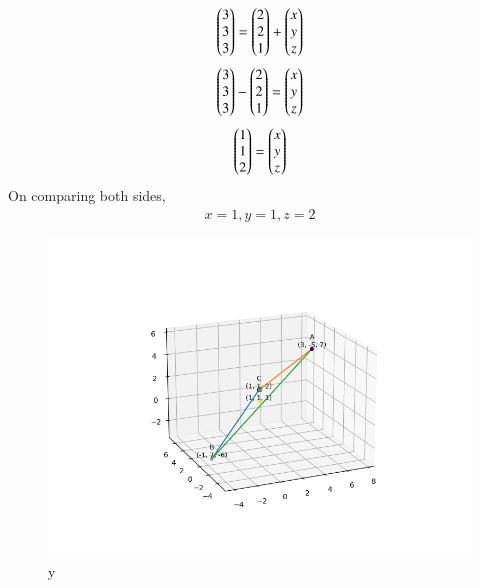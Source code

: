 \documentclass[journal]{IEEEtran}
\begin{document}
\begin{align}
\begin{pmatrix}3\\3\\3\end{pmatrix}=\begin{pmatrix}2\\2\\1\end{pmatrix}+\begin{pmatrix}x\\y\\z\end{pmatrix}\\
\end{align}
\begin{align}
\begin{pmatrix}3\\3\\3\end{pmatrix}-\begin{pmatrix}2\\2\\1\end{pmatrix}=\begin{pmatrix}x\\y\\z\end{pmatrix}\\
\end{align}
\begin{align}
\begin{pmatrix}1\\1\\2\end{pmatrix}=\begin{pmatrix}x\\y\\z\end{pmatrix}\\
\end{align}
On comparing both sides, 
\begin{align}
x=1, y=1, z=2
\end{align}
\begin{figure}[h!]
   \centering
   \includegraphics[width=0.7\linewidth]{figs/Figure_1.png}
   \caption{y}
   \label{stemplot}
\end{figure}
\end{document}

